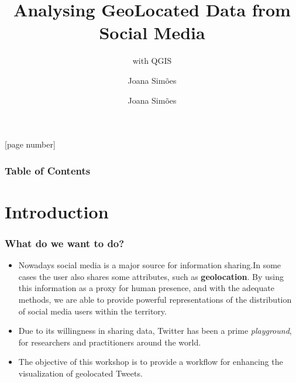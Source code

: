 \documentclass[hyperref={pdfpagelabels=true}]{beamer}
\title{Analysing GeoLocated Data from Social Media}
\subtitle{with QGIS}
\author{Joana Sim\~{o}es}
\author[shortname]{Joana Sim\~{o}es \inst{1}}
\institute[shortinst]{\inst{1} Bdigital, CASA, CICS.NOVA}
\begin{document}
[page number]
\begin{frame}

\begin{titlepage}
\end{titlepage}

\end{frame} 
  
 
\begin{frame}
\frametitle{Table of Contents}
\tableofcontents%
\end{frame}

\section{Introduction} 
\begin{frame}
\frametitle{What do we want to do?}

\begin{itemize}
  \item<1->Nowadays social media is a major source for information sharing.In some cases the user also shares some attributes, such as \textbf{geolocation}. By using this information as a proxy for human presence, and with the adequate methods, we are able to provide powerful representations of the distribution of social media users within the territory.
  \item<2->Due to its willingness in sharing data, Twitter has been a prime \textit{playground}, for researchers and practitioners around the world.
  \item<3->The objective of this workshop is to provide a workflow for enhancing the visualization of geolocated Tweets.
  \end{itemize}

\end{frame}
\end{document}
